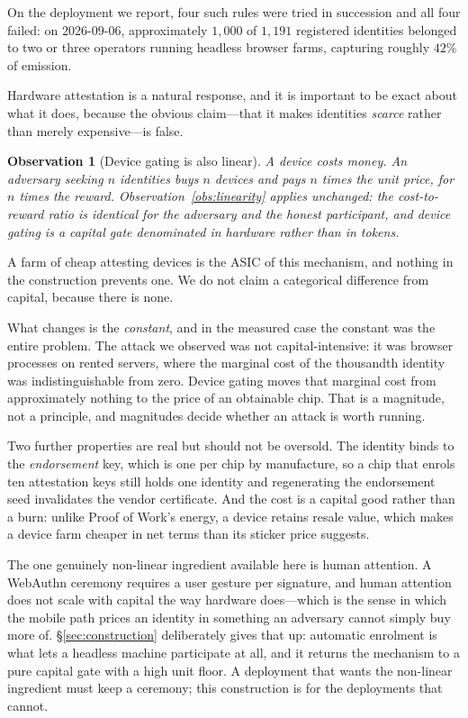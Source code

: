 \documentclass[conference,10pt]{IEEEtran}
\newtheorem{observation}{Observation}
\begin{document}
On the deployment we report, four such rules were tried in succession and all four failed: on
2026-09-06, approximately $1{,}000$ of $1{,}191$ registered identities belonged to two or three
operators running headless browser farms, capturing roughly $42\%$ of emission.

Hardware attestation is a natural response, and it is important to be exact about what it does, because
the obvious claim---that it makes identities \emph{scarce} rather than merely expensive---is false.

\begin{observation}[Device gating is also linear]
\label{obs:devicelinear}
A device costs money. An adversary seeking $n$ identities buys $n$ devices and pays $n$ times the unit
price, for $n$ times the reward. Observation~\ref{obs:linearity} applies unchanged: the cost-to-reward
ratio is identical for the adversary and the honest participant, and device gating is a capital gate
denominated in hardware rather than in tokens.
\end{observation}

A farm of cheap attesting devices is the ASIC of this mechanism, and nothing in the construction
prevents one. We do not claim a categorical difference from capital, because there is none.

What changes is the \emph{constant}, and in the measured case the constant was the entire problem. The
attack we observed was not capital-intensive: it was browser processes on rented servers, where the
marginal cost of the thousandth identity was indistinguishable from zero. Device gating moves that
marginal cost from approximately nothing to the price of an obtainable chip. That is a magnitude, not a
principle, and magnitudes decide whether an attack is worth running.

Two further properties are real but should not be oversold. The identity binds to the \emph{endorsement}
key, which is one per chip by manufacture, so a chip that enrols ten attestation keys still holds one
identity and regenerating the endorsement seed invalidates the vendor certificate. And the cost is a
capital good rather than a burn: unlike Proof of Work's energy, a device retains resale value, which
makes a device farm cheaper in net terms than its sticker price suggests.

The one genuinely non-linear ingredient available here is human attention. A WebAuthn ceremony requires a
user gesture per signature, and human attention does not scale with capital the way hardware does---which
is the sense in which the mobile path prices an identity in something an adversary cannot simply buy more
of. \S\ref{sec:construction} deliberately gives that up: automatic enrolment is what lets a headless
machine participate at all, and it returns the mechanism to a pure capital gate with a high unit floor.
A deployment that wants the non-linear ingredient must keep a ceremony; this construction is for the
deployments that cannot.
\end{document}
